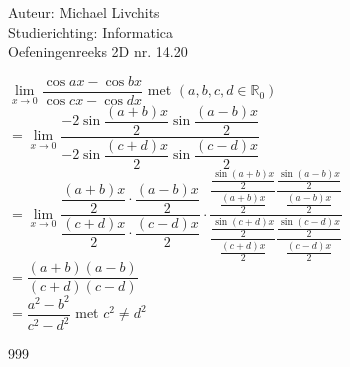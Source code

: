 \documentclass[a4paper]{article}
\begin{document}
  
\noindent \large Auteur: Michael Livchits \\
\noindent \large Studierichting: Informatica\\
\noindent \large Oefeningenreeks 2D nr. 14.20\\

\medskip

\normalsize

$ \lim\limits_{x\rightarrow 0} \dfrac{\cos ax-\cos bx}{\cos cx-\cos dx}$ met $(a,b,c,d \in \mathbb{R}_0)$\\

$= \lim\limits_{x\rightarrow 0} \dfrac{-2\sin\dfrac{(a+b)x}{2}\sin\dfrac{(a-b)x}{2}}{-2\sin\dfrac{(c+d)x}{2}\sin\dfrac{(c-d)x}{2}}$\\

$= \lim\limits_{x\rightarrow 0} \dfrac{\dfrac{(a+b)x}{2}\cdot\dfrac{(a-b)x}{2}}{\dfrac{(c+d)x}{2}\cdot\dfrac{(c-d)x}{2}}\cdot\dfrac{\dfrac{\tfrac{\sin(a+b)x}{2}}{\tfrac{(a+b)x}{2}}\dfrac{\tfrac{\sin(a-b)x}{2}}{\tfrac{(a-b)x}{2}}}{\dfrac{\tfrac{\sin(c+d)x}{2}}{\tfrac{(c+d)x}{2}}\dfrac{\tfrac{\sin(c-d)x}{2}}{\tfrac{(c-d)x}{2}}}$\\

$= \dfrac{(a+b)(a-b)}{(c+d)(c-d)}$\\

$= \dfrac{a^2-b^2}{c^2-d^2}$ met $c^2 \ne d^2$\\ 

\begin{thebibliography}{999}
\end{thebibliography}
\end{document}
